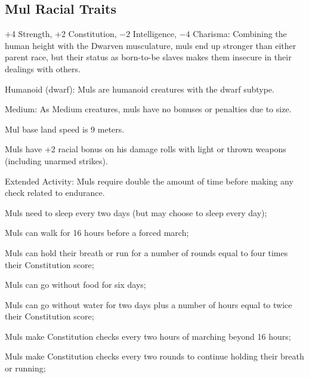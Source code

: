 \subsection{Mul Racial Traits}
\begin{itemize*}
    \item +4 Strength, +2 Constitution, $-2$ Intelligence, $-4$ Charisma: Combining the human height with the Dwarven musculature, muls end up stronger than either parent race, but their status as born-to-be slaves makes them insecure in their dealings with others.
    \item Humanoid (dwarf): Muls are humanoid creatures with the dwarf subtype.
    \item Medium: As Medium creatures, muls have no bonuses or penalties due to size.
    \item Mul base land speed is 9 meters.
    \item Muls have +2 racial bonus on his damage rolls with light or thrown weapons (including unarmed strikes).
    \item Extended Activity: Muls require double the amount of time before making any check related to endurance.
    \begin{itemize*}
        \item Muls need to sleep every two days (but may choose to sleep every day);
        \item Muls can walk for 16 hours before a forced march;
        \item Muls can hold their breath or run for a number of rounds equal to four times their Constitution score;
        \item Muls can go without food for six days;
        \item Muls can go without water for two days plus a number of hours equal to twice their Constitution score;
        \item Muls make Constitution checks every two hours of marching beyond 16 hours;
        \item Muls make Constitution checks every two rounds to continue holding their breath or running;

\end{itemize*}
\end{itemize*}
